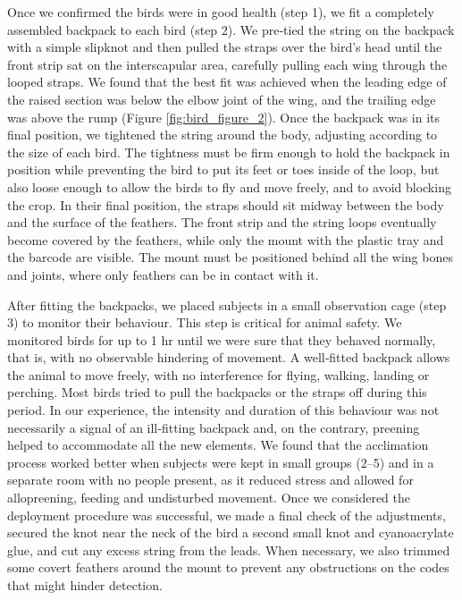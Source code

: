 \documentclass[11pt,a4paper,oneside]{book}
\begin{document}
\begin{doublespace}
Once we confirmed the birds were in good health (step 1), we fit a completely assembled backpack to each bird (step 2). We pre‐tied the string on the backpack with a simple slipknot and then pulled the straps over the bird's head until the front strip sat on the interscapular area, carefully pulling each wing through the looped straps. We found that the best fit was achieved when the leading edge of the raised section was below the elbow joint of the wing, and the trailing edge was above the rump (Figure \ref{fig:bird_figure_2}). Once the backpack was in its final position, we tightened the string around the body, adjusting according to the size of each bird. The tightness must be firm enough to hold the backpack in position while preventing the bird to put its feet or toes inside of the loop, but also loose enough to allow the birds to fly and move freely, and to avoid blocking the crop. In their final position, the straps should sit midway between the body and the surface of the feathers. The front strip and the string loops eventually become covered by the feathers, while only the mount with the plastic tray and the barcode are visible. The mount must be positioned behind all the wing bones and joints, where only feathers can be in contact with it.

After fitting the backpacks, we placed subjects in a small observation cage (step 3) to monitor their behaviour. This step is critical for animal safety. We monitored birds for up to 1 hr until we were sure that they behaved normally, that is, with no observable hindering of movement. A well‐fitted backpack allows the animal to move freely, with no interference for flying, walking, landing or perching. Most birds tried to pull the backpacks or the straps off during this period. In our experience, the intensity and duration of this behaviour was not necessarily a signal of an ill‐fitting backpack and, on the contrary, preening helped to accommodate all the new elements. We found that the acclimation process worked better when subjects were kept in small groups (2–5) and in a separate room with no people present, as it reduced stress and allowed for allopreening, feeding and undisturbed movement. Once we considered the deployment procedure was successful, we made a final check of the adjustments, secured the knot near the neck of the bird a second small knot and cyanoacrylate glue, and cut any excess string from the leads. When necessary, we also trimmed some covert feathers around the mount to prevent any obstructions on the codes that might hinder detection.


\end{doublespace}
\end{document}
